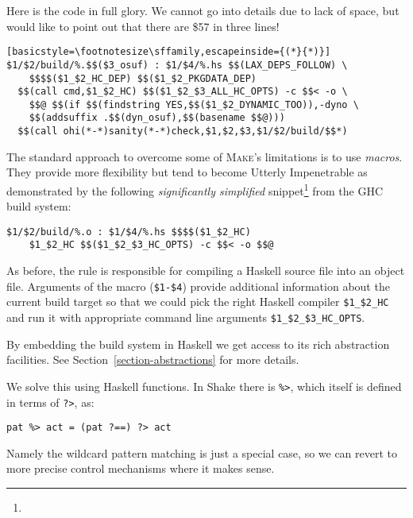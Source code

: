 \newsavebox{\exampleCode}
\begin{lrbox}{\exampleCode}
\begin{minipage}[t]{\columnwidth}
Here is the code in full glory. We cannot go into details due to lack of
space, but would like to point out that there are \$57 in three lines!
\begin{lstlisting}[basicstyle=\footnotesize\sffamily,escapeinside={(*}{*)}]
$1/$2/build/%.$$($3_osuf) : $1/$4/%.hs $$(LAX_DEPS_FOLLOW) \
    $$$$($1_$2_HC_DEP) $$($1_$2_PKGDATA_DEP)
  $$(call cmd,$1_$2_HC) $$($1_$2_$3_ALL_HC_OPTS) -c $$< -o \
    $$@ $$(if $$(findstring YES,$$($1_$2_DYNAMIC_TOO)),-dyno \
    $$(addsuffix .$$(dyn_osuf),$$(basename $$@)))
  $$(call ohi(*-*)sanity(*-*)check,$1,$2,$3,$1/$2/build/$$*)
\end{lstlisting}
\end{minipage}
\end{lrbox}

The standard approach to overcome some of \textsc{Make}'s limitations is to use
\emph{macros}. They provide more flexibility but tend to become Utterly
Impenetrable as demonstrated by the following \emph{significantly simplified}
snippet\footnote{\usebox{\exampleCode}} from the GHC build system:

\begin{lstlisting}
$1/$2/build/%.o : $1/$4/%.hs $$$$($1_$2_HC)
    $1_$2_HC $$($1_$2_$3_HC_OPTS) -c $$< -o $$@
\end{lstlisting}

\noindent As before, the rule is responsible for compiling a Haskell source
file into an object file. Arguments of the macro (\texttt{\$1-\$4}) provide
additional information about the current build target so that we could pick the
right Haskell compiler \texttt{\$1\_\$2\_HC} and run it with appropriate command
line arguments \texttt{\$1\_\$2\_\$3\_HC\_OPTS}.

By embedding the build system in Haskell we get access to its rich abstraction
facilities. See Section~\ref{section-abstractions} for more details.

We solve this using Haskell functions. In Shake there is \verb"%>", which itself is defined in terms of \verb"?>", as:

\begin{verbatim}
pat %> act = (pat ?==) ?> act
\end{verbatim}

Namely the wildcard pattern matching is just a special case, so we can revert to more precise control mechanisms where it makes sense.

